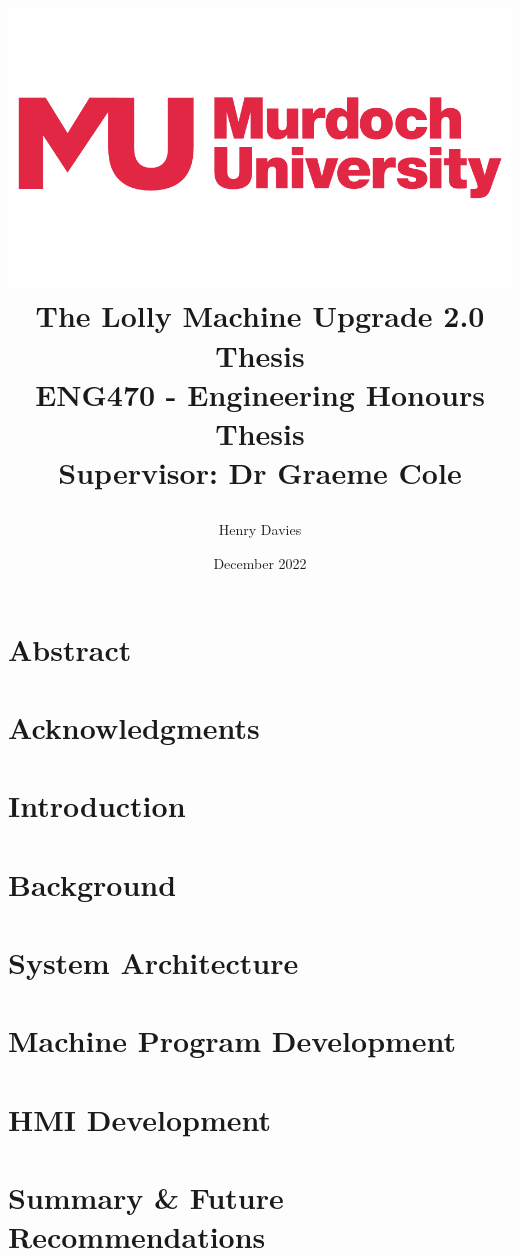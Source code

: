 \documentclass{book}
\title  {\begin{center}
            \includegraphics[scale = 0.2]{murdochLogo} 
            \vspace{10mm}
            \\{\Huge The Lolly Machine Upgrade 2.0}
            \vspace{10mm}
            \\{\Huge Thesis}
            \vspace{5mm}
            \\{\Large ENG470 - Engineering Honours Thesis}
            \vspace{40mm} 
            \\ Supervisor: Dr Graeme Cole
        \end{center}}
\author{Henry Davies}
\date{December 2022}
\begin{document}
\frontmatter

\maketitle
\newpage

\chapter*{Abstract}


\chapter*{Acknowledgments}



\tableofcontents
{}
\newpage

\listoffigures
{}
\newpage

\printglossary[type=\acronymtype]
\newpage

\mainmatter
\pagestyle{plain}

\chapter{Introduction}
    \label{chap:intro}
    
    \newpage

\chapter{Background}
    \label{chap:background}
    
    \newpage

\chapter{System Architecture}
    \label{chap:sysArch}
    
    \newpage
    
\chapter{Machine Program Development}
    \label{chap:plc}
    
    \newpage  
    
\chapter{HMI Development}
    \label{chap:hmi}
    
    \newpage
    
\chapter{Summary \& Future Recommendations}
    \label{chap:summary}
    
    \newpage
    
\printbibliography
\end{document}
